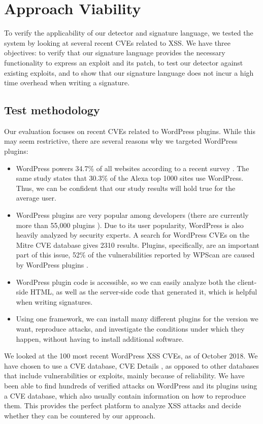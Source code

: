 \section{Approach Viability} \label{viability}

To verify the applicability of our detector and signature language, we tested the system by looking at several recent CVEs related to \ac{XSS}. We have three objectives: to verify that our signature language provides the necessary functionality to express an exploit and its patch, to test our detector against existing exploits, and to show that our signature language does not incur a high time overhead when writing a signature.

\subsection{Test methodology} \label{methodology}

Our evaluation focuses on recent CVEs related to WordPress
plugins. While this may seem restrictive, there are several reasons
why we targeted WordPress plugins:
\begin{itemize}
	\item WordPress powers 34.7\% of all websites according to a recent survey  \cite{w3stats}. The same study states that 30.3\% of the Alexa top 1000 sites use WordPress. Thus, we can be confident that our study results will hold true for the average user.
	\item WordPress plugins are very popular among developers (there are currently more than 55,000 plugins \cite{wpplugins}). Due to its user popularity, WordPress is also heavily analyzed by security experts. A search for WordPress CVEs on the Mitre CVE database \cite{cvemitre} gives 2310 results. Plugins, specifically, are an important part of this issue, 52\% of the vulnerabilities reported by WPScan are caused by WordPress plugins \cite{wpscan}.
	\item WordPress plugin code is accessible, so we can easily analyze both the client-side HTML, as well as the server-side code that generated it, which is helpful when writing signatures.
	\item Using one framework, we can install many different plugins for the version we want, reproduce attacks, and investigate the conditions under which they happen, without having to install additional software.
\end{itemize}

We looked at the 100 most recent WordPress \ac{XSS} CVEs, as of October 2018. We have chosen to use a CVE database, CVE Details \cite{cvedetails}, as opposed to other databases that include vulnerabilities or exploits, mainly because of reliability. We have been able to find hundreds of verified attacks on WordPress and its plugins using a CVE database, which also usually contain information on how to reproduce them. This provides the perfect platform to analyze \ac{XSS} attacks and decide whether they can be countered by our approach. 

